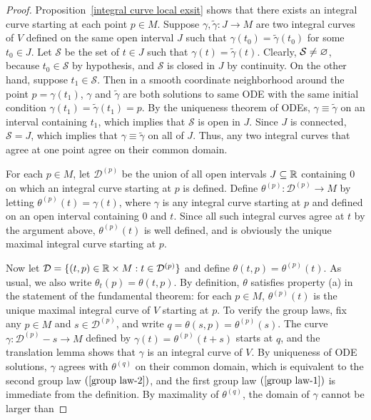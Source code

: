 \begin{proof}
Proposition~\ref{integral curve local exsit} shows that there exists an integral curve starting at each point $p\in M$. Suppose $\gamma,\widetilde{\gamma}:J\to M$ are 
two integral curves of $V$ defined on the same open interval $J$ such that $\gamma(t_0)=\widetilde{\gamma}(t_0)$ for some $t_0\in J$. Let $\mathcal{S}$ be the set 
of $t\in J$ such that $\gamma(t)=\widetilde{\gamma}(t)$. Clearly, $\mathcal{S}\neq\varnothing$, because $t_0\in\mathcal{S}$ by hypothesis, and $\mathcal{S}$ is closed in 
$J$ by continuity. On the other hand, suppose $t_1\in\mathcal{S}$. Then in a smooth coordinate neighborhood around the point $p=\gamma(t_1)$, $\gamma$ and 
$\widetilde{\gamma}$ are both solutions to same ODE with the same initial condition $\gamma(t_1)=\widetilde{\gamma}(t_1)=p$. By the uniqueness theorem of ODEs, 
$\gamma\equiv\widetilde{\gamma}$ on an interval containing $t_1$, which implies that $\mathcal{S}$ is open in $J$. Since $J$ is connected, $\mathcal{S}=J$, which 
implies that $\gamma\equiv\widetilde{\gamma}$ on all of $J$. Thus, any two integral curves that agree at one point agree on their common domain.\par
For each $p\in M$, let $\mathcal{D}^{(p)}$ be the union of all open intervals $J\subseteq\mathbb{R}$ containing $0$ on which an integral curve starting at $p$ is defined. 
Define $\theta^{(p)}:\mathcal{D}^{(p)}\to M$ by letting $\theta^{(p)}(t)=\gamma(t)$, where $\gamma$ is any integral curve starting at $p$ and defined on an open 
interval containing $0$ and $t$. Since all such integral curves agree at $t$ by the argument above, $\theta^{(p)}(t)$ is well defined, and is obviously the unique 
maximal integral curve starting at $p$.\par
Now let $\mathcal{D}=\{(t,p)\in\mathbb{R}\times M:t\in\mathcal{D}^{(p)}\}$ and define $\theta(t,p)=\theta^{(p)}(t)$. As usual, we also write $\theta_t(p)=\theta(t,p)$. 
By definition, $\theta$ satisfies property (a) in the statement of the fundamental theorem: for each $p\in M$, $\theta^{(p)}(t)$ is the unique maximal integral 
curve of $V$ starting at $p$. To verify the group laws, fix any $p\in M$ and $s\in\mathcal{D}^{(p)}$, and write $q=\theta(s,p)=\theta^{(p)}(s)$. The curve 
$\gamma:\mathcal{D}^{(p)}-s\to M$ defined by $\gamma(t)=\theta^{(p)}(t+s)$ starts at $q$, and the translation lemma shows that $\gamma$ is an integral curve 
of $V$. By uniqueness of ODE solutions, $\gamma$ agrees with $\theta^{(q)}$ on their common domain, which is equivalent to the second group law $(\ref{group law-2})$, 
and the first group law $(\ref{group law-1})$ is immediate from the definition. By maximality of $\theta^{(q)}$, the domain of $\gamma$ cannot be larger than 

\end{proof}
